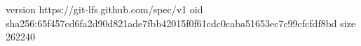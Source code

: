 version https://git-lfs.github.com/spec/v1
oid sha256:65f457cd6fa2d90d821ade7fbb42015f0f61cdc0caba51653ec7c99cfcfdf8bd
size 262240

